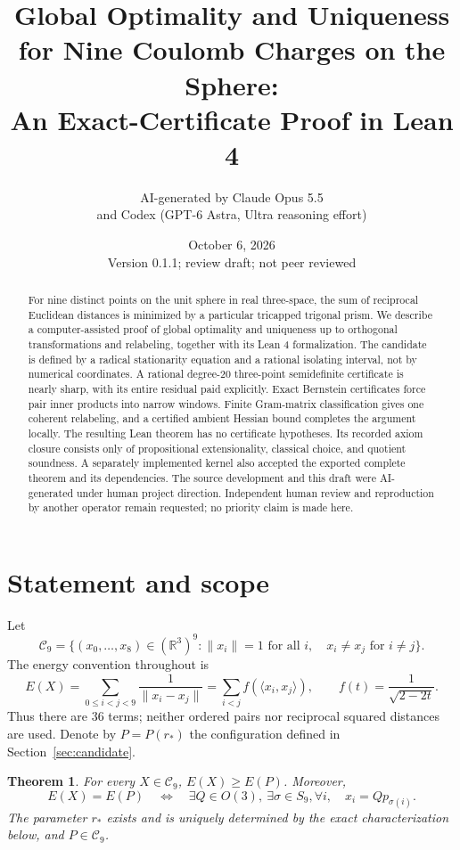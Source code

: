 \documentclass[11pt]{article}
\title{Global Optimality and Uniqueness for Nine Coulomb Charges on the Sphere:\\
An Exact-Certificate Proof in Lean 4}
\author{\small AI-generated by Claude Opus 5.5\\
\small and Codex (GPT-6 Astra, Ultra reasoning effort)}
\date{October 6, 2026\\\small Version 0.1.1; review draft; not peer reviewed}
\newtheorem{theorem}{Theorem}[section]
\theoremstyle{remark}
\newcommand{\R}{\mathbb R}
\newcommand{\ip}[2]{\langle #1,#2\rangle}
\newcommand{\norm}[1]{\lVert #1\rVert}
\begin{document}
\maketitle
\begin{abstract}
For nine distinct points on the unit sphere in real three-space, the sum of
reciprocal Euclidean distances is minimized by a particular tricapped trigonal
prism. We describe a computer-assisted proof of global optimality and uniqueness
up to orthogonal transformations and relabeling, together with its Lean 4
formalization. The candidate is defined by a radical stationarity equation and
a rational isolating interval, not by numerical coordinates. A rational
degree-20 three-point semidefinite certificate is nearly sharp, with its entire
residual paid explicitly. Exact Bernstein certificates force pair inner products
into narrow windows. Finite Gram-matrix classification gives one coherent
relabeling, and a certified ambient Hessian bound completes the argument locally.
The resulting Lean theorem has no certificate hypotheses. Its recorded axiom
closure consists only of propositional extensionality, classical choice, and
quotient soundness. A separately implemented kernel also accepted the exported
complete theorem and its dependencies. The source development and this draft
were AI-generated under human project direction. Independent human review and reproduction
by another operator remain requested; no priority claim is made here.
\end{abstract}

\section{Statement and scope}
Let
\[
 \mathcal C_9=\{(x_0,\ldots,x_8)\in(\R^3)^9:
          \norm{x_i}=1\text{ for all }i,\quad x_i\ne x_j\text{ for }i\ne j\}.
\]
The energy convention throughout is
\begin{equation}\label{eq:energy}
 E(X)=\sum_{0\le i<j<9}\frac1{\norm{x_i-x_j}}
     =\sum_{i<j} f(\ip{x_i}{x_j}),\qquad
 f(t)=\frac1{\sqrt{2-2t}}.
\end{equation}
Thus there are 36 terms; neither ordered pairs nor reciprocal squared distances
are used. Denote by $P=P(r_*)$ the configuration defined in Section~\ref{sec:candidate}.

\begin{theorem}\label{thm:main}
For every $X\in\mathcal C_9$, $E(X)\ge E(P)$. Moreover,
\[
 E(X)=E(P)\quad\Longleftrightarrow\quad
 \exists Q\in O(3),\ \exists\sigma\in S_9,
       \forall i,\quad x_i=Qp_{\sigma(i)}.
\]
The parameter $r_*$ exists and is uniquely determined by the exact
characterization below, and $P\in\mathcal C_9$.
\end{theorem}
\end{document}
